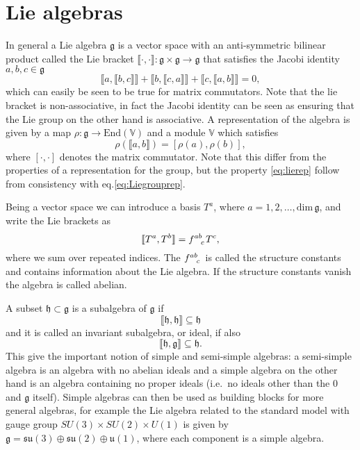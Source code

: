 \documentclass[11pt]{report}
\begin{document}
\section{Lie algebras}\label{sec:Liealgebras}
In general a Lie algebra $\mathfrak{g}$ is a vector space with an anti-symmetric bilinear product called the Lie bracket $\llbracket\cdot,\cdot\rrbracket: \mathfrak{g}\times\mathfrak{g}\to\mathfrak{g}$ that satisfies the Jacobi identity $a,b,c\in\mathfrak{g}$
\begin{equation}
\llbracket a,\llbracket b,c\rrbracket\rrbracket+\llbracket b,\llbracket c,a\rrbracket\rrbracket+\llbracket c,\llbracket a,b\rrbracket\rrbracket=0, 
\end{equation}
which can easily be seen to be true for matrix commutators. Note that the lie bracket is non-associative, in fact the Jacobi identity can be seen as ensuring that the Lie group on the other hand is associative. A representation of the algebra is given by a map $\rho: \mathfrak{g}\to \text{End}(\mathbb{V})$ and a module $\mathbb{V}$ which satisfies
\begin{equation}\label{eq:lierep}
    \rho(\llbracket a,b\rrbracket) = [\rho(a),\rho(b)],
\end{equation}
where $[\cdot,\cdot]$ denotes the matrix commutator. Note that this differ from the properties of a representation for the group, but the property \eqref{eq:lierep} follow from consistency with eq.\eqref{eq:Liegrouprep}.

Being a vector space we can introduce a basis $T^a$, where $a=1,2,\ldots,\text{dim}\,\mathfrak{g}$, and write the Lie brackets as 
\begin{equation}
    \llbracket T^a,T^b\rrbracket = \tensor{f}{^{ab}_c} T^c,
\end{equation}
where we sum over repeated indices. The $\tensor{f}{^{ab}_c}$ is called the structure constants and contains information about the Lie algebra. If the structure constants vanish the algebra is called abelian.

A subset $\mathfrak{h}\subset \mathfrak{g}$ is a subalgebra of $\mathfrak{g}$ if \begin{equation}
    \llbracket\mathfrak{h},\mathfrak{h}\rrbracket\subseteq \mathfrak{h}
\end{equation} 
and it is called an invariant subalgebra, or ideal, if also
\begin{equation}
    \llbracket\mathfrak{h},\mathfrak{g}\rrbracket\subseteq \mathfrak{h}.
\end{equation}
This give the important notion of simple and semi-simple algebras: a semi-simple algebra is an algebra with no abelian ideals and a simple algebra on the other hand is an algebra containing no proper ideals (i.e.\ no ideals other than the ${0}$ and $\mathfrak{g}$ itself). Simple algebras can then be used as building blocks for more general algebras, for example the Lie algebra related to the standard model with gauge group $SU(3)\times SU(2)\times U(1)$ is given by $\mathfrak{g}=\mathfrak{su}(3)\oplus\mathfrak{su}(2)\oplus\mathfrak{u}(1)$, where each component is a simple algebra. 
\end{document}
